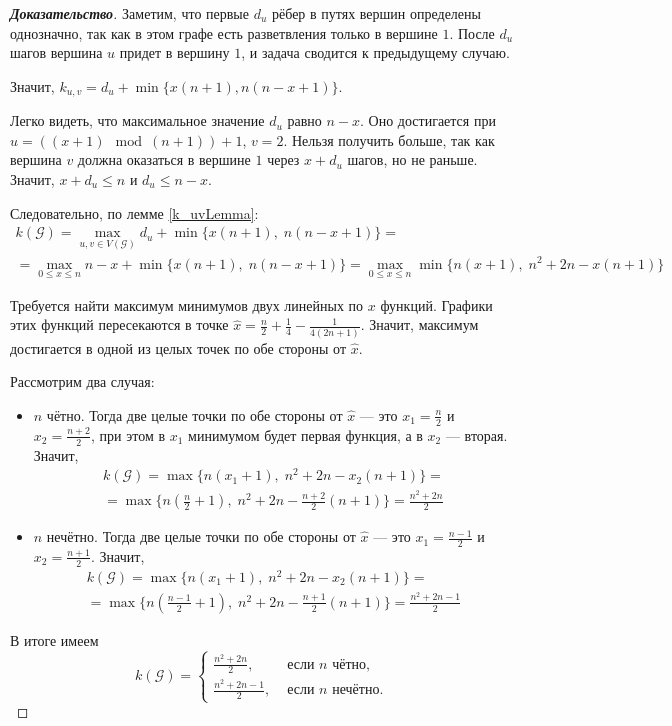 \documentclass[12pt]{article}
\begin{document}
\begin{proof}[\textbf{Доказательство}]
Заметим, что первые $d_u$ рёбер в путях вершин определены однозначно, так как в этом графе есть разветвления только в вершине $1$. После $d_u$ шагов вершина $u$ придет в вершину $1$, и задача сводится к предыдущему случаю.

Значит, $k_{u,v} = d_u + \min \{x(n+1), n(n - x + 1)\}$.

Легко видеть, что максимальное значение $d_u$ равно $n - x$. Оно достигается при $u = ((x + 1)\mod{(n+1)}) + 1$, $v = 2$. Нельзя получить больше, так как вершина $v$ должна оказаться в вершине $1$ через $x + d_u$ шагов, но не раньше. Значит, $x + d_u \le n$ и $d_u \le n - x$.

Следовательно, по лемме \ref{k_uvLemma}:\begin{multline*}
k(\mathcal{G}) = \max_{u, v \in V(\mathcal{G})} d_u + \min \{x(n+1),\; n(n - x + 1)\} =\\= \max_{0 \le x \le n} n - x + \min \{x(n+1),\; n(n - x + 1)\} = 
\max_{0 \le x \le n} \min \{n(x+1),\; n^2 + 2n - x(n+1)\}
\end{multline*}

Требуется найти максимум минимумов двух линейных по $x$ функций. Графики этих функций пересекаются в точке $\hat{x} = \frac{n}{2} + \frac{1}{4} - \frac{1}{4(2n + 1)}$. Значит, максимум 
достигается в одной из целых точек по обе стороны от $\hat{x}$.

Рассмотрим два случая: \begin{itemize}
\item $n$ чётно. Тогда две целые точки по обе стороны от $\hat{x}$ --- это $x_1 = \frac{n}{2}$ и $x_2 = \frac{n + 2}{2}$, при этом в $x_1$ минимумом будет первая функция, а в $x_2$ --- вторая. Значит, \begin{multline*}
k(\mathcal{G}) = \max \{n(x_1+1),\; n^2 + 2n - x_2(n+1) \} =\\= \max \{n(\frac{n}{2}+1),\; n^2 + 2n - \frac{n + 2}{2}(n+1) \} = \frac{n^2+2n}{2}
\end{multline*}
\item $n$ нечётно. Тогда две целые точки по обе стороны от $\hat{x}$ --- это $x_1 = \frac{n-1}{2}$ и $x_2 = \frac{n + 1}{2}$. Значит, \begin{multline*}
k(\mathcal{G}) = \max \{n(x_1+1),\; n^2 + 2n - x_2(n+1) \} =\\= \max \{n(\frac{n-1}{2}+1),\; n^2 + 2n - \frac{n + 1}{2}(n+1) \} = \frac{n^2+2n-1}{2}
\end{multline*}
\end{itemize}
В итоге имеем \begin{equation*}
k(\mathcal{G}) = \begin{cases}
        \frac{n^2 + 2n}{2},     & \text{ если } n \text{ чётно,} \\
        \frac{n^2 + 2n - 1}{2}, & \text{ если } n \text{ нечётно.}
    \end{cases}
\end{equation*}
\end{proof} 
\end{document}
